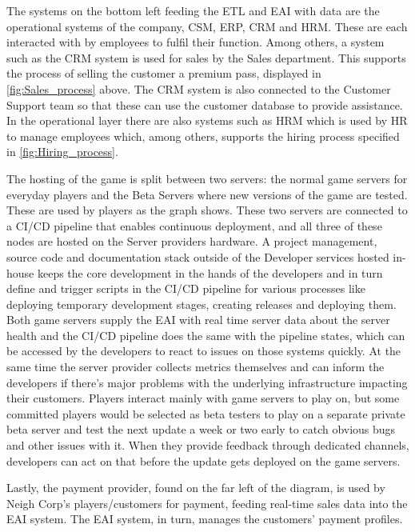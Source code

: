\documentclass{article}
\begin{document}
The systems on the bottom left feeding the ETL and EAI with data are the operational systems of the company, CSM, ERP, CRM and HRM. These are each interacted with by employees to fulfil their function. Among others, a system such as the CRM system is used for sales by the Sales department. This supports the process of selling the customer a premium pass, displayed in \autoref{fig:Sales_process} above. The CRM system is also connected to the Customer Support team so that these can use the customer database to provide assistance.
In the operational layer there are also systems such as HRM which is used by HR to manage employees which, among others, supports the hiring process specified in \autoref{fig:Hiring_process}.

The hosting of the game is split between two servers: the normal game servers for everyday players and the Beta Servers where new versions of the game are tested. These are used by players as the graph shows. These two servers are connected to a CI/CD pipeline that enables continuous deployment, and all three of these nodes are hosted on the Server providers hardware. A project management, source code and documentation stack outside of the Developer services hosted in-house keeps the core development in the hands of the developers and in turn define and trigger scripts in the CI/CD pipeline for various processes like deploying temporary development stages, creating releases and deploying them. Both game servers supply the EAI with real time server data about the server health and the CI/CD pipeline does the same with the pipeline states, which can be accessed by the developers to react to issues on those systems quickly. At the same time the server provider collects metrics themselves and can inform the developers if there's major problems with the underlying infrastructure impacting their customers. Players interact mainly with game servers to play on, but some committed players would be selected as beta testers to play on a separate private beta server and test the next update a week or two early to catch obvious bugs and other issues with it. When they provide feedback through dedicated channels, developers can act on that before the update gets deployed on the game servers.

Lastly, the payment provider, found on the far left of the diagram, is used by Neigh Corp's players/customers for payment, feeding real-time sales data into the EAI system. The EAI system, in turn, manages the customers' payment profiles.


\newpage
\end{document}
